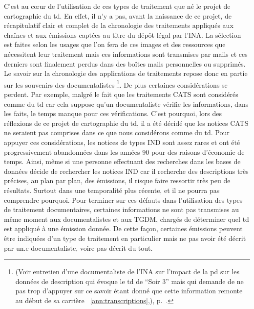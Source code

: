 C’est au cœur de l’utilisation de ces types de traitement que né le projet de cartographie du \gls{td}. En effet, il n’y a pas, avant la naissance de ce projet, de récapitulatif clair et complet de la chronologie des traitements appliqués aux chaînes et aux émissions captées au titre du dépôt légal par l’INA. La sélection est faites selon les usages que l'on fera de ces images et des ressources que nécessitent leur traitement mais ces informations sont transmises par mails et ces derniers sont finalement perdus dans des boîtes mails personnelles ou supprimés. Le savoir sur la chronologie des applications de traitements repose donc en partie sur les souvenirs des documentalistes \footnote{(Voir entretien d'une documentaliste de l'INA sur l'impact de la \gls{pd} sur les données de description qui évoque le \gls{td} de \enquote{Soir 3} mais qui demande de ne pas trop d'appuyer sur ce savoir étant donné que cette information remonte au début de sa carrière ~\ref{ann:transcriptions},), p.~\pageref{ann:transcriptions}.}. De plus certaines considérations se perdent. Par exemple, malgré le fait que les traitements CATS sont considérés comme du \gls{td} car cela suppose qu’un documentaliste vérifie les informations, dans les faits, le temps manque pour ces vérifications. C’est pourquoi, lors des réflexions de ce projet de cartographie du \gls{td}, il a été décidé que les notices CATS ne seraient pas comprises dans ce que nous considérons comme du \gls{td}. Pour appuyer ces considérations, les notices de types IND sont assez rares et ont été progressivement abandonnées dans les années 90 pour des raisons d’économie de temps. Ainsi, même si une personne effectuant des recherches dans les bases de données décide de rechercher les notices IND car il recherche des descriptions très précises, au plan par plan, des émissions, il risque faire ressortir très peu de résultats. Surtout dans une temporalité plus récente, et il ne pourra pas comprendre pourquoi. Pour terminer sur ces défauts dans l'utilisation des types de traitement documentaires, certaines informations ne sont pas transmises au même moment aux documentalistes et aux TGDM, chargés de déterminer quel \gls{td} est appliqué à une émission donnée. De cette façon, certaines émissions peuvent être indiquées d’un type de traitement en particulier mais ne pas avoir été décrit par un.e documentaliste, voire pas décrit du tout. 

